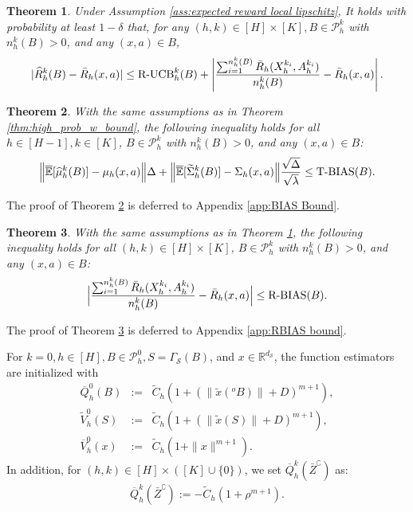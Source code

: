 \documentclass[10pt,a4paper]{amsart}
\newtheorem{theorem}{Theorem}
\begin{document}
\begin{theorem}\label{thm:reward high prob bound}
Under Assumption \ref{ass:expected reward local lipschitz}, It holds with probability at least $1-\delta$ that, for any  $(h,k) \in [H]\times [K], B\in \mathcal{P}_h^k$ with $n_h^k(B)>0$, and any $(x,a) \in B$, 
\begin{eqnarray}\label{eq:reward high prob bound}
    |\widehat{R}_{h}^{k}(B)-\bar{R}_h(x,a)| \leq \mbox{\rm R-UCB}_{h}^{k}(B)+\left|\frac{\sum_{i=1}^{n_h^k(B)}\bar{R}_{h}(X_{h}^{k_{i}},A_{h}^{k_{i}})}{n_h^k(B)}-\bar{R}_h(x,a)\right|.
\end{eqnarray}
\end{theorem}

\begin{theorem}\label{thm:BIAS Bound}
 With the same assumptions as in Theorem \ref{thm:high_prob_w_bound}, the following inequality holds for all $h\in [H-1],k\in [K]$, $B \in \mathcal{P}_h^k$ with $n_h^k(B)>0$, and any $(x,a) \in B$:
\begin{eqnarray}\label{eq:BIAS BOUND}
     \Big\|\overline{\mathbb{E}}[\widehat{\mu}_{h}^{k}(B)]-\mu_{h}(x,a)\Big\|\Delta+\Big\|\overline{\mathbb{E}}[\widetilde{\Sigma}_{h}^{k}(B)]-\Sigma_h(x,a)\Big\|\frac{\sqrt{\Delta}}{\sqrt{\lambda}} \leq \mbox{\rm T-BIAS}(B). 
\end{eqnarray}
\end{theorem}
The proof of Theorem \ref{thm:BIAS Bound} is deferred to Appendix \ref{app:BIAS Bound}.

\begin{theorem}\label{thm:RBIAS bound}
    With the same assumptions as in Theorem \ref{thm:reward high prob bound}, the following inequality holds for all $(h,k)\in [H]\times [K]$, $B \in \mathcal{P}_h^k$ with $n_{h}^{k}(B)>0$, and any $(x,a) \in B$:
    \begin{eqnarray}\label{eq:RBIAS bound}
\Big|\frac{\sum_{i=1}^{n_h^k(B)}\bar{R}_{h}(X_{h}^{k_{i}},A_{h}^{k_{i}})}{n_h^k(B)}-\bar{R}_h(x,a)\Big|\leq \mbox{\rm R-BIAS}(B). 
    \end{eqnarray}
\end{theorem}
The proof of Theorem \ref{thm:RBIAS bound} is deferred to Appendix \ref{app:RBIAS bound}.

For $k=0, h\in [H],B\in \mathcal{P}_{h}^{0}, S=\Gamma_{\mathcal{S}}(B)$, and $x\in \mathbb{R}^{d_{\mathcal{S}}}$, the function estimators are initialized with
\begin{eqnarray}\label{eq:initial value for estimation}
        \overline{Q}_h^0(B)&:=& \widetilde{C}_{h}(1+(\|\tilde{x}(^{o}B)\|+D)^{m+1}),\nonumber\\
    \widetilde{V}_h^0(S)&:=&\widetilde{C}_{h}(1+(\|\tilde{x}(S)\|+D)^{m+1}),\nonumber\\
        \overline{V}_h^0(x) &:=& \widetilde{C}_h(1+\|x\|^{m+1}).
\end{eqnarray}
In addition, for $(h,k)\in [H]\times ([K]\cup\{0\})$, we set $\overline{Q}_h^k(\bar{Z}^{\complement})$ as:
\begin{eqnarray}\label{eq:initialize outside Q}
     \overline{Q}_h^k(\bar{Z}^{\complement}):=-\widetilde{C}_{h}(1+\rho^{m+1}).
\end{eqnarray}
\end{document}
